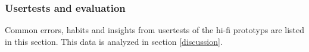 %
\subsubsection{Usertests and evaluation}
Common errors, habits and insights from usertests of the hi-fi prototyps are listed in this section. This data is analyzed in section \ref{discussion}.

